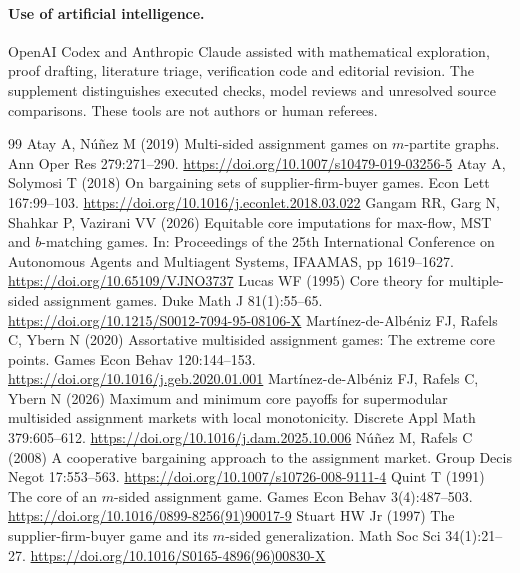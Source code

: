 \documentclass[11pt]{article}
\theoremstyle{remark}\newtheorem{remark}[theorem]{Remark}
\begin{document}
\paragraph{Use of artificial intelligence.}
OpenAI Codex and Anthropic Claude assisted with mathematical exploration,
proof drafting, literature triage, verification code and editorial revision.
The supplement distinguishes executed checks, model reviews and unresolved
source comparisons. These tools are not authors or human referees. 

\begin{thebibliography}{99}
\small\setlength{\itemsep}{1pt}
Atay A, N\'u\~nez M (2019) Multi-sided assignment games on $m$-partite graphs.
Ann Oper Res 279:271--290. \url{https://doi.org/10.1007/s10479-019-03256-5}
Atay A, Solymosi T (2018) On bargaining sets of supplier-firm-buyer games.
Econ Lett 167:99--103. \url{https://doi.org/10.1016/j.econlet.2018.03.022}
Gangam RR, Garg N, Shahkar P, Vazirani VV (2026) Equitable core imputations
for max-flow, MST and $b$-matching games. In: Proceedings of the 25th
International Conference on Autonomous Agents and Multiagent Systems,
IFAAMAS, pp 1619--1627. \url{https://doi.org/10.65109/VJNO3737}
Lucas WF (1995) Core theory for multiple-sided assignment games.
Duke Math J 81(1):55--65. \url{https://doi.org/10.1215/S0012-7094-95-08106-X}
Mart\'inez-de-Alb\'eniz FJ, Rafels C, Ybern N (2020) Assortative multisided
assignment games: The extreme core points. Games Econ Behav 120:144--153.
\url{https://doi.org/10.1016/j.geb.2020.01.001}
Mart\'inez-de-Alb\'eniz FJ, Rafels C, Ybern N (2026) Maximum and minimum core
payoffs for supermodular multisided assignment markets with local monotonicity.
Discrete Appl Math 379:605--612. \url{https://doi.org/10.1016/j.dam.2025.10.006}
N\'u\~nez M, Rafels C (2008) A cooperative bargaining approach to the assignment
market. Group Decis Negot 17:553--563.
\url{https://doi.org/10.1007/s10726-008-9111-4}
Quint T (1991) The core of an $m$-sided assignment game.
Games Econ Behav 3(4):487--503. \url{https://doi.org/10.1016/0899-8256(91)90017-9}
Stuart HW Jr (1997) The supplier-firm-buyer game and its $m$-sided generalization.
Math Soc Sci 34(1):21--27. \url{https://doi.org/10.1016/S0165-4896(96)00830-X}
\end{thebibliography}
\end{document}
